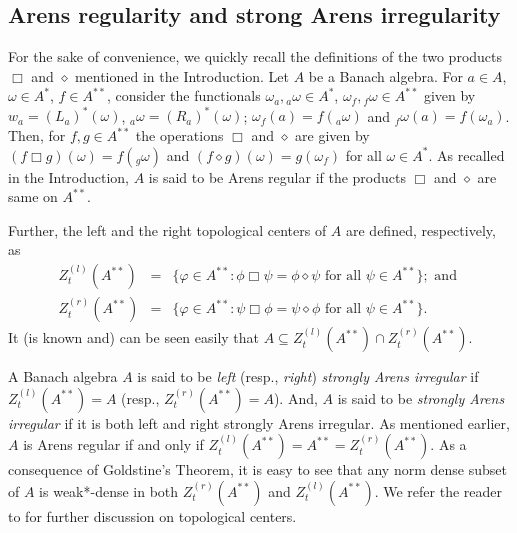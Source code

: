 \documentclass[a4]{amsart}
\theoremstyle{cupthm}
\theoremstyle{cupdefn}
\theoremstyle{cuprem}
\numberwithin{equation}{section}
\begin{document}
\subsection{Arens regularity and strong Arens irregularity}
        For the sake of convenience, we quickly recall the definitions
        of the two products $\Box$ and $\diamond$ mentioned in the
        Introduction.  Let $A$ be a Banach  algebra. For $a \in A$,
        $\omega\in A^*$, $f\in A^{**}$, consider the functionals
        $\omega_a, {}_{a}\omega\in A^*$, $\omega_f,{}_f\omega\in
        A^{**}$ given by $w_a=(L_a)^*(\omega)$,
        ${}_a\omega=(R_a)^*(\omega)$; $\omega_f(a)=f({}_a\omega)$ and
        ${}_f\omega(a)=f(\omega_a)$. Then, for $f,g\in A^{**}$ the
        operations $\Box$ and $\diamond$ are given by $(f\Box g)
        (\omega)= f({}_g\omega)$ and $(f\diamond
        g)(\omega)=g(\omega_f)$ for all $\omega \in A^*$. As recalled
        in the Introduction, $A$ is said to be Arens regular if the
        products $\Box$ and $ \diamond$ are same on $A^{**}$.

        Further, the left and the right topological centers of $A$ are defined,
respectively, as
\[
\begin{array}{rcl}
Z_t^{(l)} (A^{**}) & = & \{\varphi \in A^{**}: \phi\Box
\psi=\phi\diamond\psi \text{ for all } \psi\in A^{**} \}; \text{ and }
\\ Z_t^{(r)} (A^{**}) & = & \{\varphi \in A^{**}:
\psi\Box\phi=\psi\diamond \phi \text{ for all } \psi\in A^{**} \}.
\end{array}
\]
It (is known and) can be seen easily that $A \subseteq Z_t^{(l)}
(A^{**}) \cap Z_t^{(r)} (A^{**})$.

A Banach algebra $A$ is said to be {\em left} (resp., {\em right})
{\em strongly Arens irregular} if $Z_t^{(l)} (A^{**}) = A$ (resp.,
$Z_t^{(r)} (A^{**}) = A$). And, $A$ is said to be {\em strongly Arens
  irregular} if it is both left and right strongly Arens irregular. As
mentioned earlier, $A$ is Arens regular if and only if $Z_t^{(l)}
(A^{**}) = A^{**} = Z_t^{(r)} (A^{**})$. As a consequence of
Goldstine's Theorem, it is easy to see that any norm dense subset of
$A$ is weak*-dense in both $Z_t^{(r)}(A^{**})$ and
$Z_t^{(l)}(A^{**})$.  We refer the reader to \cite{DL} for further
discussion on topological centers.
\end{document}
